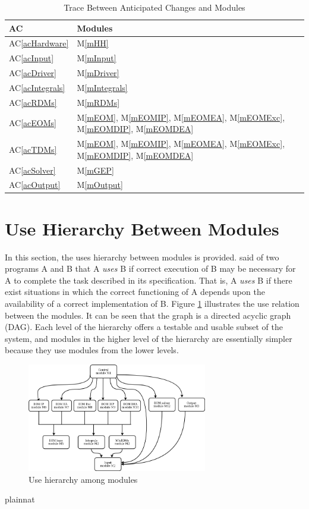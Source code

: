\documentclass[12pt, titlepage]{article}
\newcommand{\acref}[1]{AC\ref{#1}}
\newcommand{\mref}[1]{M\ref{#1}}
\begin{document}
\begin{table}[H]
\centering
\begin{tabular}{p{} p{}}
\toprule
\textbf{AC} & \textbf{Modules}\\
\midrule
\acref{acHardware} & \mref{mHH}\\
\acref{acInput} & \mref{mInput}\\
\acref{acDriver} & \mref{mDriver}\\
\acref{acIntegrals} & \mref{mIntegrals}\\
\acref{acRDMs} & \mref{mRDMs}\\
\acref{acEOMs} & \mref{mEOM}, \mref{mEOMIP}, \mref{mEOMEA}, \mref{mEOMExc}, 
\mref{mEOMDIP}, \mref{mEOMDEA}\\
\acref{acTDMs} & \mref{mEOM}, \mref{mEOMIP}, \mref{mEOMEA}, \mref{mEOMExc}, 
\mref{mEOMDIP}, \mref{mEOMDEA}\\
\acref{acSolver} & \mref{mGEP}\\
\acref{acOutput} & \mref{mOutput}\\
\bottomrule
\end{tabular}
\caption{Trace Between Anticipated Changes and Modules}
\label{TblACT}
\end{table}

\section{Use Hierarchy Between Modules} \label{SecUse}

In this section, the uses hierarchy between modules is
provided. \citet{Parnas1978} said of two programs A and B that A {\em uses} B if
correct execution of B may be necessary for A to complete the task described in
its specification. That is, A {\em uses} B if there exist situations in which
the correct functioning of A depends upon the availability of a correct
implementation of B.  Figure \ref{FigUH} illustrates the use relation between
the modules. It can be seen that the graph is a directed acyclic graph
(DAG). Each level of the hierarchy offers a testable and usable subset of the
system, and modules in the higher level of the hierarchy are essentially simpler
because they use modules from the lower levels.

\begin{figure}[H]
\centering
\includegraphics[width=0.7\textwidth]{UsesHierarchy.png}
\caption{Use hierarchy among modules}
\label{FigUH}
\end{figure}


 {plainnat}

\end{document}
